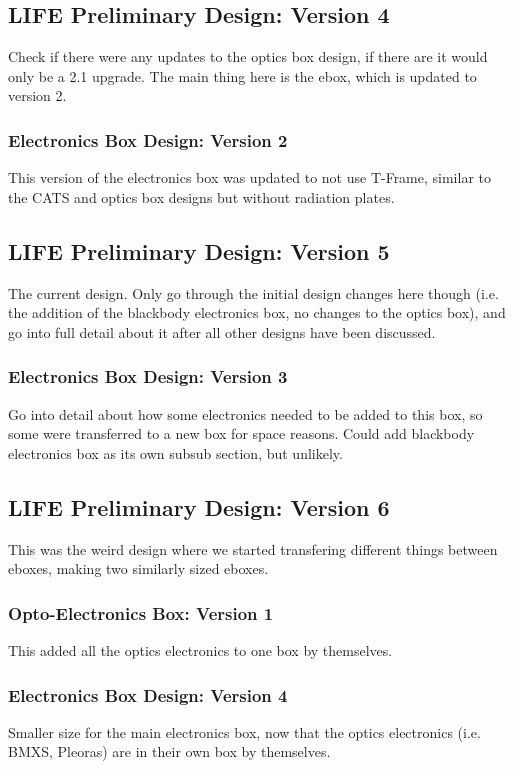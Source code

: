 \subsection{LIFE Preliminary Design: Version 4}
Check if there were any updates to the optics box design, if there are it would only be a 2.1 upgrade. The main thing here is the ebox, which is updated to version 2.

\subsubsection{Electronics Box Design: Version 2}
This version of the electronics box was updated to not use T-Frame, similar to the CATS and optics box designs but without radiation plates.

\subsection{LIFE Preliminary Design: Version 5}
The current design. Only go through the initial design changes here though (i.e. the addition of the blackbody electronics box, no changes to the optics box), and go into full detail about it after all other designs have been discussed.

\subsubsection{Electronics Box Design: Version 3}
Go into detail about how some electronics needed to be added to this box, so some were transferred to a new box for space reasons. Could add blackbody electronics box as its own subsub section, but unlikely.

\subsection{LIFE Preliminary Design: Version 6}
This was the weird design where we started transfering different things between eboxes, making two similarly sized eboxes.

\subsubsection{Opto-Electronics Box: Version 1}
This added all the optics electronics to one box by themselves.

\subsubsection{Electronics Box Design: Version 4}
Smaller size for the main electronics box, now that the optics electronics (i.e. BMXS, Pleoras) are in their own box by themselves.

